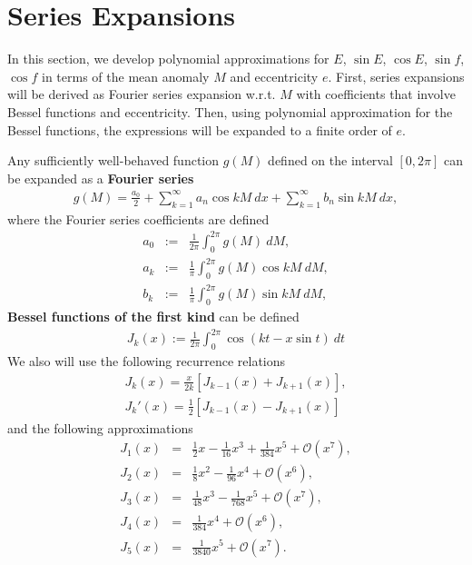 \documentclass [12pt, a4paper] {article}
\begin{document}
\newpage
\appendix
\section{Series Expansions}
In this section, we develop polynomial approximations for $E$, $\sin E$, $\cos E$, $\sin f$, $\cos f$
in terms of the mean anomaly $M$ and eccentricity $e$. First, series expansions will be derived 
as Fourier series expansion w.r.t. $M$ with coefficients that involve Bessel functions and 
eccentricity. Then, using polynomial approximation for the Bessel functions, the expressions 
will be expanded to a finite order of $e$.

Any sufficiently well-behaved function $g(M)$ defined on the interval $[0, 2\pi]$ 
can be expanded as a \textbf{Fourier series}
\begin {eqnarray}
    g(M) 
    =
    \frac{a_0}{2} 
    + 
    \sum_{k=1}^\infty a_n\cos kM\:dx 
    + 
    \sum_{k=1}^\infty b_n\sin kM\:dx, 
\end {eqnarray}
where the Fourier series coefficients are defined
\begin {eqnarray}
    a_0 &:=& \frac{1}{2\pi}\int_0^{2\pi}g(M)\:dM, 
    \\
    a_k &:=& \frac{1}{\pi}\int_0^{2\pi}g(M)\cos kM\:dM, 
    \\
    b_k &:=& \frac{1}{\pi}\int_0^{2\pi}g(M)\sin kM\:dM, 
\end{eqnarray}
\textbf{Bessel functions of the first kind} can be defined 
\begin {eqnarray}
    \label{eq:bessel_int}
    J_k(x) := \frac{1}{2\pi}\int_0^{2\pi}\cos(kt - x\sin t)\:dt
\end {eqnarray}
We also will use the following recurrence relations
\begin {eqnarray}
    \label{eq:bessel_add}
    J_k(x) = \frac{x}{2k}[J_{k-1}(x) + J_{k+1}(x)],
    \\
    \label{eq:bessel_sub}
    J_k'(x) = \frac{1}{2}[J_{k-1}(x) - J_{k+1}(x)]
\end {eqnarray}
and the following approximations 
\begin {eqnarray}
    J_1(x) 
    &=& 
    \frac{1}{2}x - \frac{1}{16}x^3 + \frac{1}{384}x^5 + \mathcal{O}(x^7), 
    \\
    J_2(x) 
    &=& 
    \frac{1}{8}x^2 - \frac{1}{96}x^4 + \mathcal{O}(x^6), 
    \\
    J_3(x) 
    &=& 
    \frac{1}{48}x^3 - \frac{1}{768}x^5 + \mathcal{O}(x^7), 
    \\
    J_4(x) 
    &=& 
    \frac{1}{384}x^4 + \mathcal{O}(x^6), 
    \\
    J_5(x) 
    &=& 
    \frac{1}{3840}x^5 + \mathcal{O}(x^7).
\end {eqnarray}
\end{document}

